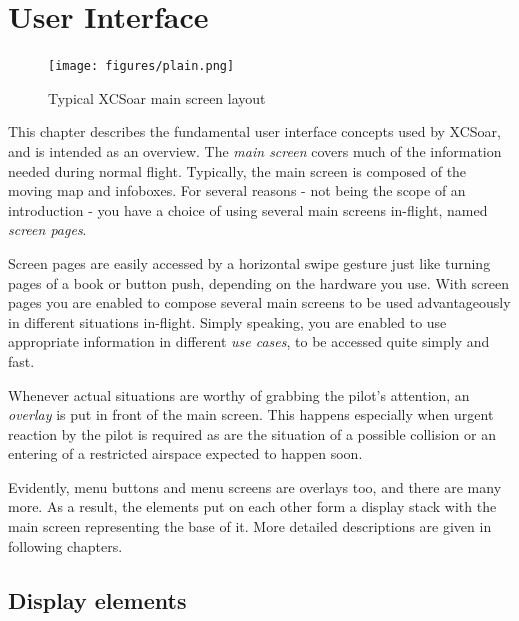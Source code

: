 \chapter{User Interface}\label{cha:interface}
\begin{figure}[h]
\texttt{[image: figures/plain.png]}
\caption{Typical XCSoar main screen layout}
\end{figure}

This chapter describes the fundamental user interface concepts used by
XCSoar, and is intended as an overview. The \emph{main screen} covers much of
the information needed during normal flight.  Typically, the main screen is
composed of the moving map and infoboxes. For several reasons - not being the
scope of an introduction - you have a choice of using several main screens
in-flight, named \emph{screen pages}.

Screen pages are easily accessed by a horizontal swipe gesture just like
turning pages of a book or button push, depending on the hardware you use.
With screen pages you are enabled to compose several main screens to be used
advantageously in different situations in-flight. Simply speaking, you are
enabled to use appropriate information in different \emph{use cases}, to be
accessed quite simply and fast.

Whenever actual situations are worthy of grabbing the pilot's attention, an
\emph{overlay} is put in front of the main screen. This happens especially
when urgent reaction by the pilot is required as are the situation of a
possible collision or an entering of a restricted airspace expected to happen
soon.

Evidently, menu buttons and menu screens are overlays too, and there are many
more. As a result, the elements put on each other form a display stack with
the main screen representing the base of it. More detailed descriptions are
given in following chapters.



\section{Display elements}
